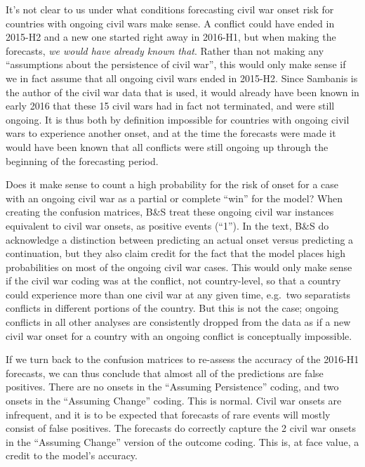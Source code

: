 \documentclass[
]{article}
\begin{document}
It's not clear to us under what conditions forecasting civil war onset risk for countries with ongoing civil wars make sense. A
conflict could have ended in 2015-H2 and a new one started right away in 2016-H1, but when making the forecasts, \emph{we would have already known that}. Rather than not making any ``assumptions about the persistence of civil war'', this would only make sense if we in fact assume that all ongoing civil wars ended in 2015-H2. Since Sambanis is the author of the civil war data that is used, it would already have been known in early 2016 that these 15 civil wars had in fact not terminated, and were still ongoing. It is thus both by definition impossible for countries with ongoing civil wars to experience another onset, and at the time the forecasts were made it would have been known that all conflicts were still ongoing up through the beginning of the forecasting period.

Does it make sense to count a high probability for the risk of onset for a case with an ongoing civil war as a partial or complete ``win'' for the model? When creating the confusion matrices, B\&S treat these ongoing civil war instances equivalent to civil war onsets, as positive events (``1''). In the text, B\&S do acknowledge a distinction between predicting an actual onset versus predicting a continuation, but they also claim credit for the fact that the model places high probabilities on most of the ongoing civil war cases. This would only make sense if the civil war coding was at the conflict, not country-level, so that a country could experience more than one civil war at any given time, e.g.~two separatists conflicts in different portions of the country. But this is not the case; ongoing conflicts in all other analyses are consistently dropped from the data as if a new civil war onset for a country with an ongoing conflict is conceptually impossible.

If we turn back to the confusion matrices to re-assess the accuracy of the 2016-H1 forecasts, we can thus conclude that almost all of the predictions are false positives. There are no onsets in the ``Assuming Persistence'' coding, and two onsets in the ``Assuming Change'' coding. This is normal. Civil war onsets are infrequent, and it is to be expected that forecasts of rare events will mostly consist of false positives. The forecasts do correctly capture the 2 civil war onsets in the ``Assuming Change'' version of the outcome coding. This is, at face value, a credit to the model's accuracy.
\end{document}

